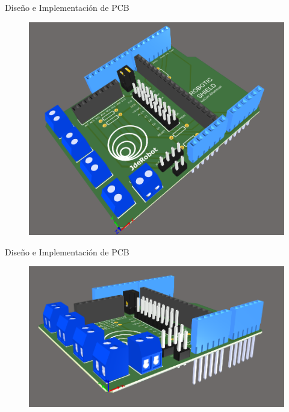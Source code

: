 \documentclass{beamer}
\begin{document}
\begin{frame}{Diseño e Implementación de PCB}
		\begin{figure}[H]
	\center
	\includegraphics[scale=0.40]{imagenes/Balancing_Robot/Vista3D1.PNG}
\end{figure}
\end{frame}

\begin{frame}{Diseño e Implementación de PCB}
	\begin{center}
	\begin{figure}[H]
		\center
		\includegraphics[scale=0.5]{imagenes/Balancing_Robot/Vista3D2.PNG}
	\end{figure}
\end{center}
\end{frame}
\end{document}
